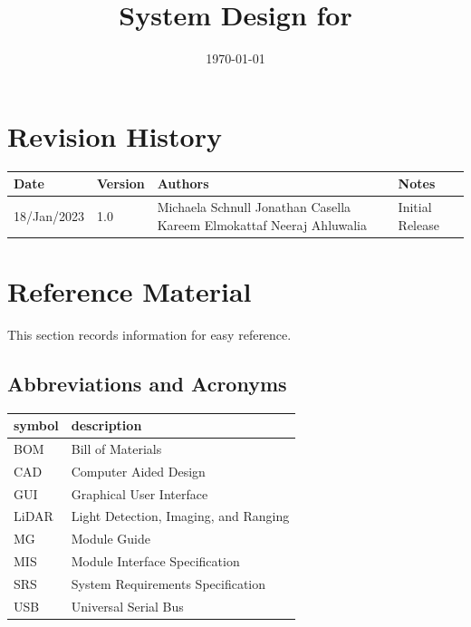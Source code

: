 \documentclass[12pt, titlepage]{article}
\begin{document}
\title{System Design for \progname{}} 
\author{\authname}
\date{\today}

\maketitle


\section{Revision History}


\begin{tabularx}{\textwidth}{p{3cm}p{2cm}p{4cm}X}
\toprule {\bf Date} & {\bf Version} & {\bf Authors} & {\bf Notes}\\
\midrule
18/Jan/2023 & 1.0 & Michaela Schnull \newline Jonathan Casella \newline Kareem Elmokattaf \newline Neeraj Ahluwalia & Initial Release\\
\bottomrule
\end{tabularx}

\newpage

\section{Reference Material}

This section records information for easy reference.

\subsection{Abbreviations and Acronyms}

\renewcommand{\arraystretch}{1.2}
\begin{tabular}{l l} 
  \toprule		
  \textbf{symbol} & \textbf{description}\\
  \midrule 
  BOM & Bill of Materials\\
  CAD & Computer Aided Design\\
  GUI & Graphical User Interface\\
  LiDAR & Light Detection, Imaging, and Ranging\\
  MG & Module Guide\\
  MIS & Module Interface Specification\\
  SRS & System Requirements Specification\\
  USB & Universal Serial Bus\\
  \bottomrule
\end{tabular}\\
\end{document}
